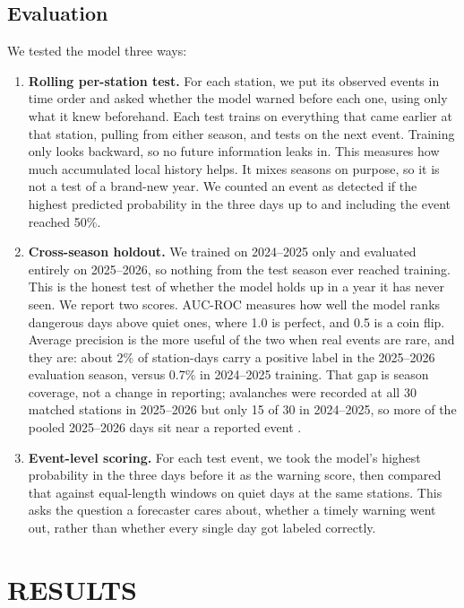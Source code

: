 \documentclass{issw}
\begin{document}
\subsection{Evaluation}
We tested the model three ways:
\begin{enumerate}
  \item \textbf{Rolling per-station test.} For each station, we put its observed events in time order and asked whether the model warned before each one, using only what it knew beforehand. Each test trains on everything that came earlier at that station, pulling from either season, and tests on the next event. Training only looks backward, so no future information leaks in. This measures how much accumulated local history helps. It mixes seasons on purpose, so it is not a test of a brand-new year. We counted an event as detected if the highest predicted probability in the three days up to and including the event reached 50\%.
  \item \textbf{Cross-season holdout.} We trained on 2024–2025 only and evaluated entirely on 2025–2026, so nothing from the test season ever reached training. This is the honest test of whether the model holds up in a year it has never seen. We report two scores. AUC-ROC measures how well the model ranks dangerous days above quiet ones, where 1.0 is perfect, and 0.5 is a coin flip. Average precision is the more useful of the two when real events are rare, and they are: about 2\% of station-days carry a positive label in the 2025–2026 evaluation season, versus 0.7\% in 2024–2025 training. That gap is season coverage, not a change in reporting; avalanches were recorded at all 30 matched stations in 2025–2026 but only 15 of 30 in 2024–2025, so more of the pooled 2025–2026 days sit near a reported event \parencite{SaitoRehmsmeier2015}.
  \item \textbf{Event-level scoring.} For each test event, we took the model's highest probability in the three days before it as the warning score, then compared that against equal-length windows on quiet days at the same stations. This asks the question a forecaster cares about, whether a timely warning went out, rather than whether every single day got labeled correctly.
\end{enumerate}

\section{RESULTS}
\end{document}
